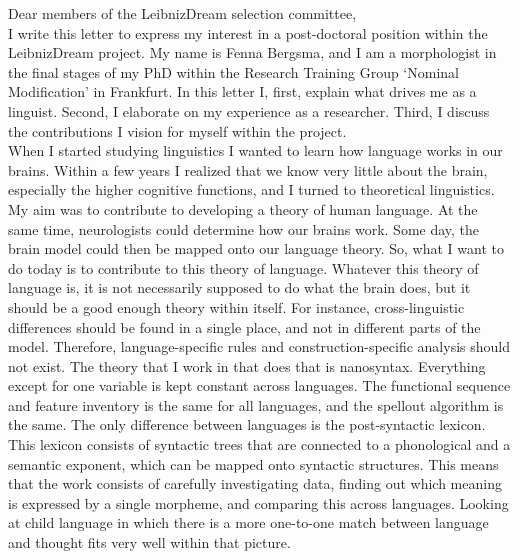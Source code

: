 \documentclass[12pt]{article}
\begin{document}

Dear members of the LeibnizDream selection committee,\\

I write this letter to express my interest in a post-doctoral position within the LeibnizDream project. My name is Fenna Bergsma, and I am a morphologist in the final stages of my PhD within the Research Training Group `Nominal Modification' in Frankfurt. In this letter I, first, explain what drives me as a linguist. Second, I elaborate on my experience as a researcher. Third, I discuss the contributions I vision for myself within the project.\\

When I started studying linguistics I wanted to learn how language works in our brains. Within a few years I realized that we know very little about the brain, especially the higher cognitive functions, and I turned to theoretical linguistics. My aim was to contribute to developing a theory of human language. At the same time, neurologists could determine how our brains work. Some day, the brain model could then be mapped onto our language theory. So, what I want to do today is to contribute to this theory of language. Whatever this theory of language is, it is not necessarily supposed to do what the brain does, but it should be a good enough theory within itself. For instance, cross-linguistic differences should be found in a single place, and not in different parts of the model. Therefore, language-specific rules and construction-specific analysis should not exist. The theory that I work in that does that is nanosyntax. Everything except for one variable is kept constant across languages. The functional sequence and feature inventory is the same for all languages, and the spellout algorithm is the same. The only difference between languages is the post-syntactic lexicon. This lexicon consists of syntactic trees that are connected to a phonological and a semantic exponent, which can be mapped onto syntactic structures. This means that the work consists of carefully investigating data, finding out which meaning is expressed by a single morpheme, and comparing this across languages. Looking at child language in which there is a more one-to-one match between language and thought fits very well within that picture.\\
\end{document}
